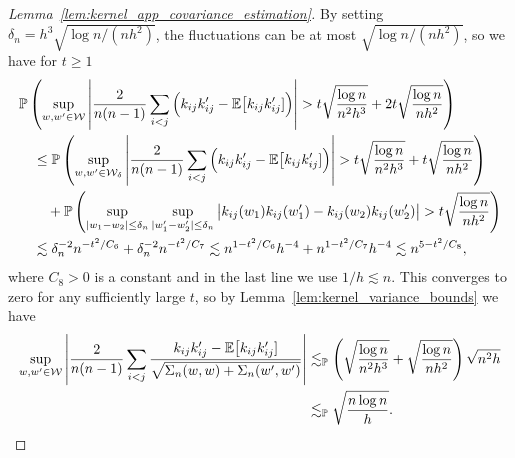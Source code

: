 \begin{proof}[Lemma~\ref{lem:kernel_app_covariance_estimation}]
  By setting
  $\delta_n = h^3\sqrt{\log n / (n h^2)}$,
  the fluctuations can be at most $\sqrt{\log n / (n h^2)}$,
  so we have for $t \geq 1$
  \begin{align*}
    &\mathbb{P}\left(
      \sup_{w,w' \in \mathcal{W}}
      \left|
      \frac{2}{n(n-1)}
      \sum_{i<j}
      \Big(
        k_{i j} k_{i j}'
        - \mathbb{E}\big[k_{i j} k_{i j}']
      \Big)
      \right|
      > t \sqrt{\frac{\log n}{n^2h^3}}
      + 2t \sqrt{\frac{\log n}{n h^2}}
    \right) \\
    &\quad\leq
    \mathbb{P}\left(
      \sup_{w,w' \in \mathcal{W}_\delta}
      \left|
      \frac{2}{n(n-1)}
      \sum_{i<j}
      \Big(
        k_{i j} k_{i j}'
        - \mathbb{E}\big[k_{i j} k_{i j}']
      \Big)
      \right|
      > t \sqrt{\frac{\log n}{n^2h^3}}
      + t \sqrt{\frac{\log n}{n h^2}}
    \right) \\
    &\qquad+
    \mathbb{P}\left(
      \sup_{|w_1-w_2| \leq \delta_n}
      \sup_{|w_1'-w_2'| \leq \delta_n}
      \big|
      k_{i j}(w_1)
      k_{i j}(w_1')
      - k_{i j}(w_2)
      k_{i j}(w_2')
      \big|
      > t \sqrt{\frac{\log n}{n h^2}}
    \right) \\
    &\quad\lesssim
    \delta_n^{-2} n^{-t^2 / C_6}
    + \delta_n^{-2} n^{-t^2 / C_7}
    \lesssim
    n^{1-t^2 / C_6} h^{-4}
    + n^{1-t^2 / C_7} h^{-4}
    \lesssim
    n^{5-t^2 / C_8},
  \end{align*}
  where $C_8 > 0$ is a constant and
  in the last line we use $1/h \lesssim n$.
  This converges to zero for any sufficiently large $t$,
  so by Lemma~\ref{lem:kernel_variance_bounds} we have
  \begin{align*}
    \sup_{w,w' \in \mathcal{W}}
    \left|
    \frac{2}{n(n-1)}
    \sum_{i<j}
    \frac{k_{i j} k_{i j}' - \mathbb{E}\big[k_{i j} k_{i j}']}
    {\sqrt{\Sigma_n(w,w) + \Sigma_n(w',w')}}
    \right|
    &\lesssim_{\mathbb{P}}
    \left(
      \sqrt{\frac{\log n}{n^2h^3}}
      + \sqrt{\frac{\log n}{n h^2}}
    \right)
    \sqrt{n^2h} \\
    &\lesssim_{\mathbb{P}}
    \sqrt{\frac{n \log n}{h}}.
  \end{align*}



\end{proof}
